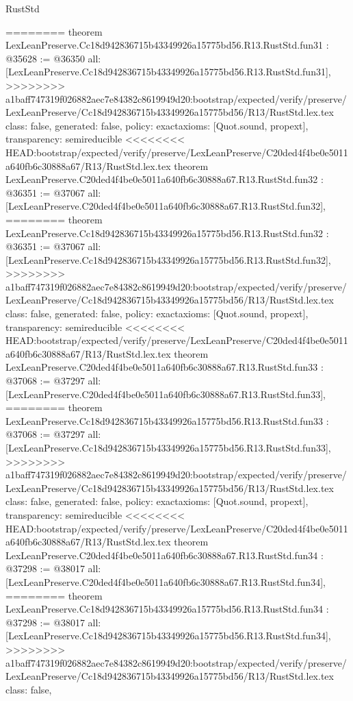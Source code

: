 \begin{lexlean}{RustStd}
\begin{coremodule}
{\begin{coremodule}
{{{{{{{{{{{{{{{{{{{{{{{{{{{{{{{{{{========
theorem LexLeanPreserve.Cc18d942836715b43349926a15775bd56.R13.RustStd.fun31 : @35628 := @36350 {
  all: [LexLeanPreserve.Cc18d942836715b43349926a15775bd56.R13.RustStd.fun31],
>>>>>>>> a1baff747319f026882aec7e84382c8619949d20:bootstrap/expected/verify/preserve/LexLeanPreserve/Cc18d942836715b43349926a15775bd56/R13/RustStd.lex.tex
  class: false,
  generated: false,
  policy: exact{axioms: [Quot.sound, propext]},
  transparency: semireducible
}
<<<<<<<< HEAD:bootstrap/expected/verify/preserve/LexLeanPreserve/C20ded4f4be0e5011a640fb6c30888a67/R13/RustStd.lex.tex
theorem LexLeanPreserve.C20ded4f4be0e5011a640fb6c30888a67.R13.RustStd.fun32 : @36351 := @37067 {
  all: [LexLeanPreserve.C20ded4f4be0e5011a640fb6c30888a67.R13.RustStd.fun32],
========
theorem LexLeanPreserve.Cc18d942836715b43349926a15775bd56.R13.RustStd.fun32 : @36351 := @37067 {
  all: [LexLeanPreserve.Cc18d942836715b43349926a15775bd56.R13.RustStd.fun32],
>>>>>>>> a1baff747319f026882aec7e84382c8619949d20:bootstrap/expected/verify/preserve/LexLeanPreserve/Cc18d942836715b43349926a15775bd56/R13/RustStd.lex.tex
  class: false,
  generated: false,
  policy: exact{axioms: [Quot.sound, propext]},
  transparency: semireducible
}
<<<<<<<< HEAD:bootstrap/expected/verify/preserve/LexLeanPreserve/C20ded4f4be0e5011a640fb6c30888a67/R13/RustStd.lex.tex
theorem LexLeanPreserve.C20ded4f4be0e5011a640fb6c30888a67.R13.RustStd.fun33 : @37068 := @37297 {
  all: [LexLeanPreserve.C20ded4f4be0e5011a640fb6c30888a67.R13.RustStd.fun33],
========
theorem LexLeanPreserve.Cc18d942836715b43349926a15775bd56.R13.RustStd.fun33 : @37068 := @37297 {
  all: [LexLeanPreserve.Cc18d942836715b43349926a15775bd56.R13.RustStd.fun33],
>>>>>>>> a1baff747319f026882aec7e84382c8619949d20:bootstrap/expected/verify/preserve/LexLeanPreserve/Cc18d942836715b43349926a15775bd56/R13/RustStd.lex.tex
  class: false,
  generated: false,
  policy: exact{axioms: [Quot.sound, propext]},
  transparency: semireducible
}
<<<<<<<< HEAD:bootstrap/expected/verify/preserve/LexLeanPreserve/C20ded4f4be0e5011a640fb6c30888a67/R13/RustStd.lex.tex
theorem LexLeanPreserve.C20ded4f4be0e5011a640fb6c30888a67.R13.RustStd.fun34 : @37298 := @38017 {
  all: [LexLeanPreserve.C20ded4f4be0e5011a640fb6c30888a67.R13.RustStd.fun34],
========
theorem LexLeanPreserve.Cc18d942836715b43349926a15775bd56.R13.RustStd.fun34 : @37298 := @38017 {
  all: [LexLeanPreserve.Cc18d942836715b43349926a15775bd56.R13.RustStd.fun34],
>>>>>>>> a1baff747319f026882aec7e84382c8619949d20:bootstrap/expected/verify/preserve/LexLeanPreserve/Cc18d942836715b43349926a15775bd56/R13/RustStd.lex.tex
  class: false,
}}}}}}}}}}}}}}}}}}}}}}}}}}}}}}}}}}}}}}
\end{coremodule}}
\end{coremodule}
\end{lexlean}
